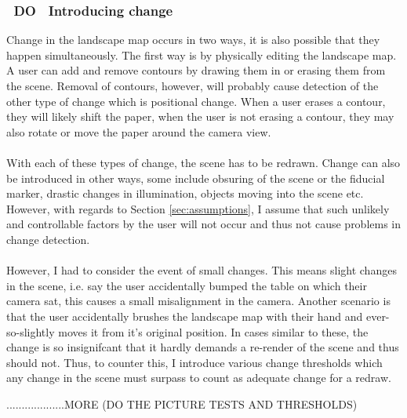 \documentclass[11pt]{article}
\begin{document}
\subsubsection{~DO~ Introducing change}
Change in the landscape map occurs in two ways, it is also possible that
they happen simultaneously. The first way is by 
physically editing the landscape map. A user
can add and remove contours by drawing them in or erasing them from the 
scene. Removal of contours, however, will probably cause detection of
the other type of change which is positional change. When a user erases
a contour, they will likely shift the paper, when the user is not
erasing a contour, they may also rotate or move the paper around the camera
view.\\
\\
With each of these types of change, the scene has to be redrawn. Change
can also be introduced in other ways, some include obsuring of the scene
or the fiducial marker, drastic changes in illumination, objects
moving into the scene etc. However, with regards to 
Section \ref{sec:assumptions}, I assume that such unlikely and controllable
factors by the user will not occur and thus not cause problems in
change detection.\\
\\
However, I had to consider the event of small changes. This means slight
changes in the scene, i.e. say the user accidentally bumped the table on
which their camera sat, this causes a small misalignment in the camera.
Another scenario is that the user accidentally brushes the landscape map
with their hand and ever-so-slightly moves it from it's original position.
In cases similar to these, the change is so insignifcant that it hardly
demands a re-render of the scene and thus should not. Thus, to counter
this, I introduce various change thresholds which any change in the scene 
must surpass to count as adequate change for a redraw.

...................MORE (DO THE PICTURE TESTS AND THRESHOLDS)
\end{document}
